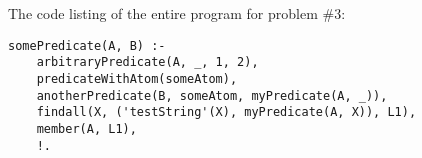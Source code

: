 \documentclass{article}
\begin{document}
	
		\rmfamily
		\noindent The code listing of the entire program for problem \#3:
		\begin{verbatim}
somePredicate(A, B) :-
    arbitraryPredicate(A, _, 1, 2),
    predicateWithAtom(someAtom),
    anotherPredicate(B, someAtom, myPredicate(A, _)),
    findall(X, ('testString'(X), myPredicate(A, X)), L1),
    member(A, L1),
    !.		\end{verbatim}
		
		
\paragraph{}\
\paragraph{}\

	\rmfamily

		
\end{document}
